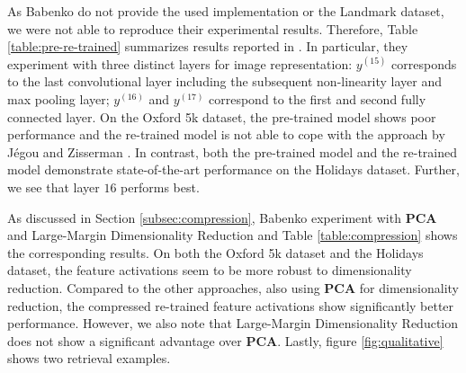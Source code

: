 As Babenko \etal do not provide the used implementation or the Landmark dataset, we were not able to reproduce their experimental results. Therefore, Table \ref{table:pre-re-trained} summarizes results reported in \cite{BabenkoSlesarevChigorinLempitsky:2014}. In particular, they experiment with three distinct layers for image representation: $y^{(15)}$ corresponds to the last convolutional layer including the subsequent non-linearity layer and max pooling layer; $y^{(16)}$ and $y^{(17)}$ correspond to the first and second fully connected layer. On the Oxford 5k dataset, the pre-trained model shows poor performance and the re-trained model is not able to cope with the approach by J{\'e}gou and Zisserman \cite{JegouZisserman:2014}. In contrast, both the pre-trained model and the re-trained model demonstrate state-of-the-art performance on the Holidays dataset. Further, we see that layer $16$ performs best.

As discussed in Section \ref{subsec:compression}, Babenko \etal experiment with \textbf{PCA} and Large-Margin Dimensionality Reduction and Table \ref{table:compression} shows the corresponding results. On both the Oxford 5k dataset and the Holidays dataset, the feature activations seem to be more robust to dimensionality reduction. Compared to the other approaches, also using \textbf{PCA} for dimensionality reduction, the compressed re-trained feature activations show significantly better performance. However, we also note that Large-Margin Dimensionality Reduction does not show a significant advantage over \textbf{PCA}. Lastly, figure \ref{fig:qualitative} shows two retrieval examples.

